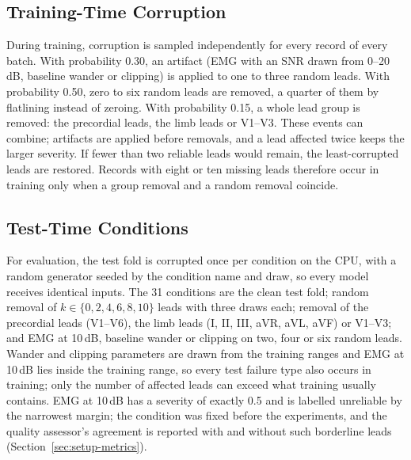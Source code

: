 \subsection{Training-Time Corruption}
\label{sec:data-train}
During training, corruption is sampled independently for every record of every batch. With probability 0.30, an
artifact (EMG with an SNR drawn from 0--20\,dB, baseline wander or clipping) is applied to one to three random
leads. With probability 0.50, zero to six random leads are removed, a quarter of them by flatlining instead of
zeroing. With probability 0.15, a whole lead group is removed: the precordial leads, the limb leads or V1--V3.
These events can combine; artifacts are applied before removals, and a lead affected twice keeps the larger
severity. If fewer than two reliable leads would remain, the least-corrupted leads are restored. Records with eight
or ten missing leads therefore occur in training only when a group removal and a random removal coincide.

\subsection{Test-Time Conditions}
\label{sec:data-test}
For evaluation, the test fold is corrupted once per condition on the CPU, with a random generator seeded by the
condition name and draw, so every model receives identical inputs. The 31 conditions are the clean test fold; random
removal of $k\in\{0,2,4,6,8,10\}$ leads with three draws each; removal of the precordial leads (V1--V6), the limb
leads (I, II, III, aVR, aVL, aVF) or V1--V3; and EMG at 10\,dB, baseline wander or clipping on two, four or six
random leads. Wander and clipping parameters are drawn from the training ranges and EMG at 10\,dB lies inside the
training range, so every test failure type also occurs in training; only the number of affected leads can exceed
what training usually contains. EMG at 10\,dB has a severity of exactly 0.5 and is labelled unreliable by the
narrowest margin; the condition was fixed before the experiments, and the quality assessor's agreement is reported
with and without such borderline leads (Section~\ref{sec:setup-metrics}).
